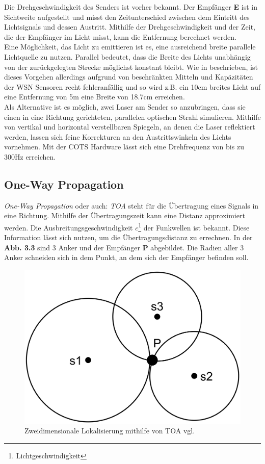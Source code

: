 \documentclass[12pt, a4wide]{scrreprt}
\begin{document}
Die Drehgeschwindigkeit des Senders ist vorher bekannt. Der Empfänger {\bf E} ist in Sichtweite aufgestellt und misst den Zeitunterschied zwischen dem Eintritt des Lichtsignals und dessen Austritt. Mithilfe der Drehgeschwindigkeit und der Zeit, die der Empfänger im Licht misst, kann die Entfernung berechnet werden.\\
\indent
Eine Möglichkeit, das Licht zu emittieren ist es, eine ausreichend breite parallele Lichtquelle zu nutzen. Parallel bedeutet, dass die Breite des Lichts unabhängig von der zurückgelegten Strecke möglichst konstant bleibt. Wie in \cite{lighthouse} beschrieben, ist dieses Vorgehen allerdings aufgrund von beschränkten Mitteln und Kapäzitäten der WSN Sensoren recht fehleranfällig und so wird z.B. ein 10cm breites Licht auf eine Entfernung von 5m eine Breite von 18.7cm erreichen.\\
\indent
Als Alternative ist es möglich, zwei Laser am Sender so anzubringen, dass sie einen in eine Richtung gerichteten, parallelen optischen Strahl simulieren. Mithilfe von vertikal und horizontal verstellbaren Spiegeln, an denen die Laser reflektiert werden, lassen sich feine Korrekturen an den Austrittswinkeln des Lichts vornehmen. Mit der \ac{COTS} Hardware lässt sich eine Drehfrequenz von bis zu 300Hz\cite{lighthouse} erreichen. 

  \subsection{One-Way Propagation}
\textit{One-Way Propagation} oder auch: \textit{\ac{TOA}} steht für die Übertragung eines Signals in eine Richtung\cite{toa}. Mithilfe der Übertragungszeit kann eine Distanz approximiert werden. Die Ausbreitungsgeschwindigkeit $c$\footnote{Lichtgeschwindigkeit} der Funkwellen ist bekannt. Diese Information lässt sich nutzen, um die Übertragungsdistanz zu errechnen. In der {\bf Abb. 3.3} sind 3 Anker und der Empfänger {\bf P} abgebildet. Die Radien aller 3 Anker schneiden sich in dem Punkt, an dem sich der Empfänger befinden soll.

\begin{figure}[!htb]
\centering
\includegraphics[scale=.07]{toa.png}
\caption{Zweidimensionale Lokalisierung mithilfe von TOA vgl.\cite{toa}}
\end{figure}
\end{document}
